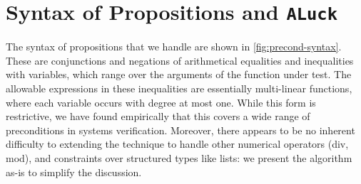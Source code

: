 \documentclass[sigconf,nonacm,review,anonymous]{acmart}
\begin{document}


\section{Syntax of Propositions and \texttt{ALuck}}
\label{sec:luck}

The syntax of propositions that we handle are shown in
\autoref{fig:precond-syntax}. These are conjunctions and negations of
arithmetical equalities and inequalities with variables, which range over
the arguments of the function under test. The allowable expressions in these inequalities are
essentially multi-linear functions, where each variable occurs with degree at
most one. While this form is restrictive, we have found empirically that this covers
a wide range of preconditions in systems verification. Moreover, there
appears to be no inherent difficulty to extending the technique to handle
other numerical operators (div, mod), and constraints over structured types like lists: we present the algorithm as-is to
simplify the discussion.
\end{document}
